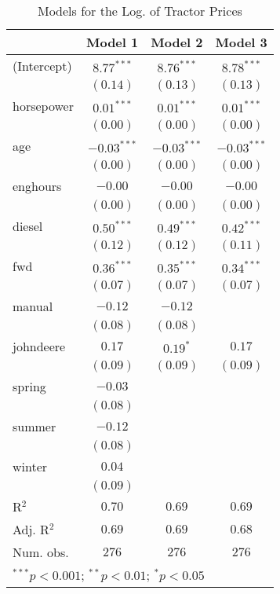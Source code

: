 
\begin{table}
\begin{center}
\begin{tabular}{l c c c}
\hline
 & Model 1 & Model 2 & Model 3 \\
\hline
(Intercept) & $8.77^{***}$  & $8.76^{***}$  & $8.78^{***}$  \\
            & $(0.14)$      & $(0.13)$      & $(0.13)$      \\
horsepower  & $0.01^{***}$  & $0.01^{***}$  & $0.01^{***}$  \\
            & $(0.00)$      & $(0.00)$      & $(0.00)$      \\
age         & $-0.03^{***}$ & $-0.03^{***}$ & $-0.03^{***}$ \\
            & $(0.00)$      & $(0.00)$      & $(0.00)$      \\
enghours    & $-0.00$       & $-0.00$       & $-0.00$       \\
            & $(0.00)$      & $(0.00)$      & $(0.00)$      \\
diesel      & $0.50^{***}$  & $0.49^{***}$  & $0.42^{***}$  \\
            & $(0.12)$      & $(0.12)$      & $(0.11)$      \\
fwd         & $0.36^{***}$  & $0.35^{***}$  & $0.34^{***}$  \\
            & $(0.07)$      & $(0.07)$      & $(0.07)$      \\
manual      & $-0.12$       & $-0.12$       &               \\
            & $(0.08)$      & $(0.08)$      &               \\
johndeere   & $0.17$        & $0.19^{*}$    & $0.17$        \\
            & $(0.09)$      & $(0.09)$      & $(0.09)$      \\
spring      & $-0.03$       &               &               \\
            & $(0.08)$      &               &               \\
summer      & $-0.12$       &               &               \\
            & $(0.08)$      &               &               \\
winter      & $0.04$        &               &               \\
            & $(0.09)$      &               &               \\
\hline
R$^2$       & $0.70$        & $0.69$        & $0.69$        \\
Adj. R$^2$  & $0.69$        & $0.69$        & $0.68$        \\
Num. obs.   & $276$         & $276$         & $276$         \\
\hline
\multicolumn{4}{l}{\scriptsize{$^{***}p<0.001$; $^{**}p<0.01$; $^{*}p<0.05$}}
\end{tabular}
\caption{Models for the Log. of Tractor Prices}
\label{tab:reg_reduction}
\end{center}
\end{table}
